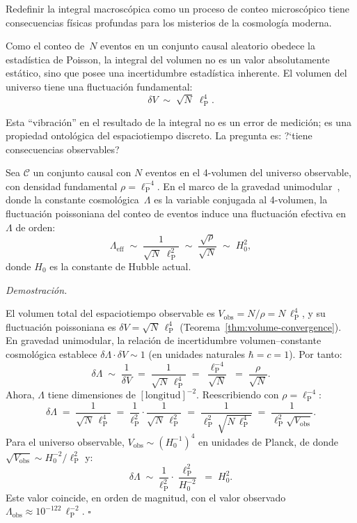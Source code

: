 \documentclass[11pt, a4paper, openany]{book}
\newcommand{\lP}{\ell_{\mathrm{P}}}
\renewenvironment{proof}[1][Demostraci\'on]{%
  \par\noindent\textit{#1.}\quad
}{\hfill$\square$\par\medskip}
\begin{document}
Redefinir la integral macrosc\'opica como un proceso de conteo
microsc\'opico tiene consecuencias f\'isicas profundas para los
misterios de la cosmolog\'ia moderna.

Como el conteo de~$N$ eventos en un conjunto causal aleatorio obedece
la estad\'istica de Poisson, la integral del volumen no es un valor
absolutamente est\'atico, sino que posee una incertidumbre
estad\'istica inherente. El volumen del universo tiene una fluctuaci\'on
fundamental:
\begin{equation}
  \delta V \;\sim\; \sqrt{N}\;\lP^4.
  \label{eq:volume-fluctuation}
\end{equation}

Esta ``vibraci\'on'' en el resultado de la integral no es un error de
medici\'on; es una propiedad ontol\'ogica del espaciotiempo discreto.
La pregunta es: ?`tiene consecuencias observables?

\begin{theorem}
\label{thm:sorkin-lambda}
Sea $\mathcal{C}$ un conjunto causal con $N$ eventos en el
4-volumen del universo observable, con densidad fundamental
$\rho = \lP^{-4}$. En el marco de la gravedad
unimodular~\cite{einstein1919,unruh1989}, donde la
constante cosmol\'ogica~$\Lambda$ es la variable conjugada al
4-volumen, la fluctuaci\'on poissoniana del conteo de eventos induce
una fluctuaci\'on efectiva en~$\Lambda$ de orden:
\begin{equation}
  \boxed{\;
  \Lambda_{\text{eff}}
  \;\sim\; \frac{1}{\sqrt{N}\;\lP^2}
  \;\sim\; \frac{\sqrt{\rho}}{\sqrt{N}}
  \;\sim\; H_0^2,
  \;}
  \label{eq:sorkin-lambda}
\end{equation}
donde $H_0$ es la constante de Hubble actual.
\end{theorem}

\begin{proof}
El volumen total del espaciotiempo observable es
$V_{\mathrm{obs}} = N/\rho = N\,\lP^4$, y su fluctuaci\'on
poissoniana es $\delta V = \sqrt{N}\,\lP^4$
(Teorema~\ref{thm:volume-convergence}). En gravedad unimodular, la
relaci\'on de incertidumbre volumen--constante cosmol\'ogica establece
$\delta\Lambda \cdot \delta V \sim 1$ (en unidades naturales
$\hbar = c = 1$). Por tanto:
\[
  \delta\Lambda
  \;\sim\; \frac{1}{\delta V}
  \;=\; \frac{1}{\sqrt{N}\,\lP^4}
  \;=\; \frac{\lP^{-4}}{\sqrt{N}}
  \;=\; \frac{\rho}{\sqrt{N}}.
\]
Ahora, $\Lambda$ tiene dimensiones de $[\text{longitud}]^{-2}$.
Reescribiendo con $\rho = \lP^{-4}$:
\[
  \delta\Lambda
  \;=\; \frac{1}{\sqrt{N}\,\lP^4}
  \;=\; \frac{1}{\lP^2} \cdot \frac{1}{\sqrt{N}\,\lP^2}
  \;=\; \frac{1}{\lP^2\,\sqrt{N\,\lP^4}}
  \;=\; \frac{1}{\lP^2 \sqrt{V_{\mathrm{obs}}}}.
\]
Para el universo observable, $V_{\mathrm{obs}} \sim (H_0^{-1})^4$
en unidades de Planck, de donde
$\sqrt{V_{\mathrm{obs}}} \sim H_0^{-2}/\lP^2$ y:
\[
  \delta\Lambda
  \;\sim\; \frac{1}{\lP^2} \cdot
           \frac{\lP^2}{H_0^{-2}}
  \;=\; H_0^2.
\]
Este valor coincide, en orden de magnitud, con el valor observado
$\Lambda_{\text{obs}} \approx 10^{-122}\,\lP^{-2}$.
\end{proof}
\end{document}
